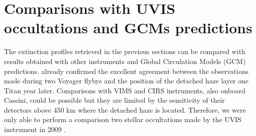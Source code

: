 \section{Comparisons with UVIS occultations and GCMs predictions}

The extinction profiles retrieved in the previous sections can be compared with results
obtained with other instruments and Global Circulation Models (GCM) predictions.
\cite{West2018} already confirmed the excellent agreement between the observations made during
two Voyager flybys and the position of the detached haze layer one Titan year later.
Comparisons with VIMS and CIRS instruments, also onboard Cassini, could be possible but
they are limited by the sensitivity of their detectors above 450 km where the detached haze is located.
Therefore, we were only able to perform a comparison two stellar occultations
made by the UVIS instrument in 2009 \citep{Koskinen2011}.


